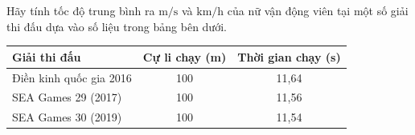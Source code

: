\begin{vd} Hãy tính tốc độ trung bình ra $\text{m/s}$ và $\text{km/h}$ của nữ vận động viên tại một số giải thi đấu dựa vào số liệu trong bảng bên dưới.
\begin{center}
\renewcommand{\arraystretch}{1.2}
\begin{tabular}{|l|c|c|}
\hline
\textbf{Giải thi đấu} & \textbf{Cự li chạy (m)} & \textbf{Thời gian chạy (s)} \\
\hline
Điền kinh quốc gia 2016 & 100 & 11{,}64 \\
\hline
SEA Games 29 (2017) & 100 & 11{,}56 \\
\hline
SEA Games 30 (2019) & 100 & 11{,}54 \\
\hline
\end{tabular}
\end{center}
\end{vd}

